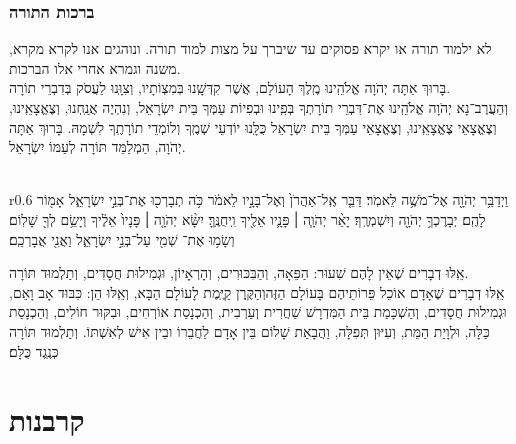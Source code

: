 \documentclass[12pt,letterpaper]{siddur}
\begin{document}
\subsection{ברכות התורה}
\scriptsize{\textsf{לא ילמוד תורה או יקרא פסוקים עד שיברך על מצות למוד תורה. ונוהגים אנו לקרא מקרא, משנה וגמרא אחרי אלו הברכות.}}\normalsize\\
בָּרוּךְ אַתָּה יְהֹוָה אֱלֹהֵֽינוּ מֶֽלֶךְ הָעוֹלָם, אֲשֶׁר קִדְּשָֽׁנוּ בְּמִצְוֹתָיו, וְצִוָּֽנוּ לַעֲסֹק בְּדִבְרֵי תוֹרָה.\\
וְהַעֲרֶב־נָא יְהֹוָה אֱלֹהֵֽינוּ אֶת־דִּבְרֵי תוֹרָתְךָ בְּפִֽינוּ וּבְפִיוֹת עַמְּךָ בֵּית יִשְׂרָאֵל, וְנִהְיֶה אֲנַֽחְנוּ, וְצֶאֱצָאֵֽינוּ, וְצֶאֱצָאֵי צֶאֱצָאֵֽינוּ, וְצֶאֱצָאֵי עַמְּךָ בֵּית יִשְׂרָאֵל כֻּלָּֽנוּ יוֹדְעֵי שְׁמֶֽךָ וְלוֹמְדֵי תוֹרָתֶֽךָ לִשְׁמָהּ. בָּרוּךְ אַתָּה יְהֹוָה, הַמְלַמֵּד תּוֹרָה לְעַמּוֹ יִשְׂרָאֵל.\\\\
\begin{wrapfigure}{r}{0.6\textwidth}
וַיְדַבֵּ֥ר יְהֹוָ֖ה אֶל־מֹשֶׁ֥ה לֵּאמֹֽר׃ דַּבֵּ֤ר אֶֽל־אַהֲרֹן֙\linebreak
וְאֶל־בָּנָ֣יו לֵאמֹ֔ר כֹּ֥ה תְבָרְכ֖וּ אֶת־בְּנֵ֣י יִשְׂרָאֵ֑ל\linebreak
אָמ֖וֹר לָהֶֽם׃\hfill
יְבָרֶכְךָ֥ יְהֹוָ֖ה\linebreak
וְיִשְׁמְרֶֽךָ׃\hfill
יָאֵ֨ר יְהֹוָ֧ה ׀ פָּנָ֛יו אֵלֶ֖יךָ\linebreak
וִֽיחֻנֶּֽךָּ׃\hfill
יִשָּׂ֨א יְהֹוָ֤ה ׀ פָּנָיו֙ אֵלֶ֔יךָ וְיָשֵׂ֥ם\linebreak
לְךָ֖ שָׁלֽוֹם׃\hfill
וְשָׂמ֥וּ אֶת־\linebreak
שְׁמִ֖י עַל־בְּנֵ֣י יִשְׂרָאֵ֑ל וַאֲנִ֖י אֲבָרְכֵֽם׃
\end{wrapfigure}
אֵֽלּוּ דְבָרִים שֶׁאֵין לָהֶם שִׁעוּר: הַפֵּאָה, וְהַבִּכּוּרִים, וְהָרְאָיוֹן, וּגְמִילוּת חֲסָדִים, וְתַלְמוּד תּוֹרָה.\\
אֵֽלּוּ דְבָרִים שֶׁאָדָם אוֹכֵל פֵּרוֹתֵיהֶם בָּעוֹלָם הַזֶּה\linebreak וְהַקֶּֽרֶן קַיֶּֽמֶת לָעוֹלָם הַבָּא, וְאֵֽלּוּ הֵן: כִּבּוּד אָב וָאֵם, וּגְמִילוּת חֲסָדִים, וְהַשְׁכָּמַת בֵּית הַמִּדְרָשׁ שַׁחֲרִית וְעַרְבִית, וְהַכְנָסַת אוֹרְחִים, וּבִקּוּר חוֹלִים, וְהַכְנָסַת כַּלָּה, וּלְוָיַת הַמֵּת, וְעִיּוּן תְּפִלָּה, וַהֲבָאַת שָׁלוֹם בֵּין אָדָם לַחֲבֵרוֹ ובֵין אִישׁ לְאִשְׁתּוֹ. וְתַלְמוּד תּוֹרָה כְּנֶֽגֶד כֻּלָּם׃
\chapter{קרבנות}
\end{document}
